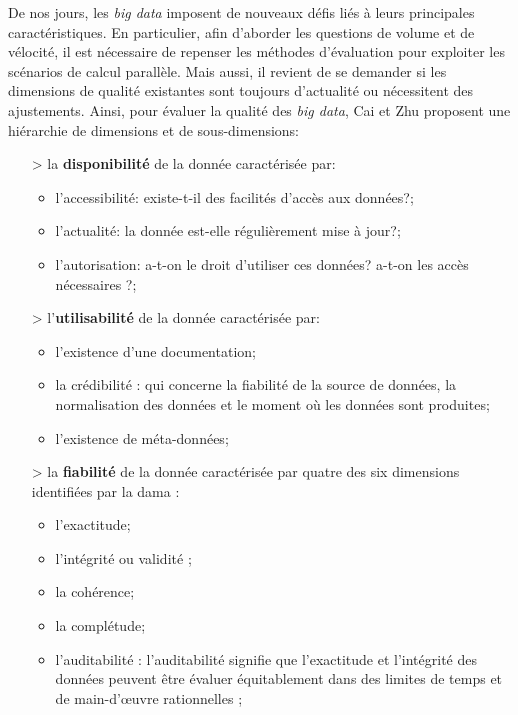 De nos jours, les \textit{big data} imposent de nouveaux défis liés à leurs principales caractéristiques. En particulier, afin d'aborder les questions de volume et de vélocité, il est nécessaire de repenser les méthodes d'évaluation pour exploiter les scénarios de calcul parallèle. Mais aussi, il revient de se demander si les dimensions de qualit\'e existantes sont toujours d'actualit\'e ou n\'ecessitent des ajustements. Ainsi, pour \'evaluer la qualit\'e des \textit{big data}, Cai et Zhu \cite{Cai_Zhu_2015} proposent une hi\'erarchie de dimensions et de sous-dimensions: 
\begin{itemize}

\item[>] la \textbf{disponibilit\'e} de la donn\'ee caract\'eris\'ee par:
\begin{itemize}[parsep=0cm,itemsep=0cm]
\item l'accessibilit\'e:  existe-t-il des facilit\'es d'acc\`es aux donn\'ees?; 
\item l'actualit\'e: la donn\'ee est-elle r\'eguli\`erement mise \`a jour?;
\item l'autorisation: a-t-on le droit d'utiliser ces donn\'ees? a-t-on les acc\`es n\'ecessaires ?;
\end{itemize}

\item[>] l'\textbf{utilisabilit\'e}  de la donn\'ee caract\'eris\'ee par:
\begin{itemize}[parsep=0cm,itemsep=0cm]
\item l'existence d'une documentation;
\item la cr\'edibilit\'e : qui concerne la fiabilit\'e de la source de donn\'ees, la normalisation des donn\'ees et le moment o\`u les donn\'ees sont produites;
\item l'existence de m\'eta-donn\'ees;
\end{itemize}

\item[>] la \textbf{fiabilit\'e} de la donn\'ee caract\'eris\'ee par quatre des six dimensions identifiées par la \acrshort{dama} \cite{dama}:
\begin{itemize}[parsep=0cm,itemsep=0cm]
\item l'exactitude;
\item l'int\'egrit\'e ou validit\'e \cite{dama} ;
\item la coh\'erence;
\item la compl\'etude;
\item l'auditabilit\'e : l'auditabilité signifie que l'exactitude et l'intégrité des données  peuvent être évaluer équitablement dans des limites de temps et de main-d'œuvre rationnelles ;
\end{itemize}


\end{itemize}
